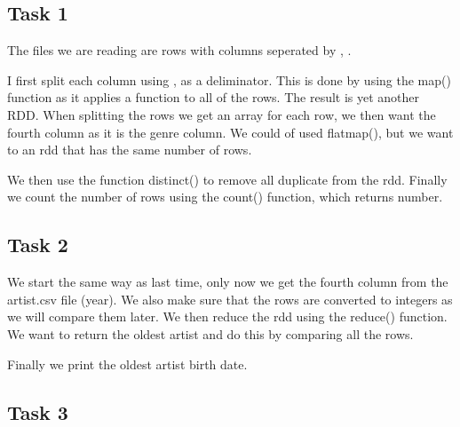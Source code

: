 \documentclass[12pt]{article}
\begin{document}
\subsection{Task 1}

The files we are reading are rows with columns seperated by , .

I first split each column using , as a deliminator. This is done by using the map() function as it applies a function to all of the rows. The result is yet another RDD. When splitting the rows we get an array for each row, we then want the fourth column as it is the genre column. We could of used flatmap(), but we want to an rdd that has the same number of rows.

We then use the function distinct() to remove all duplicate from the rdd. Finally we count the number of rows using the count() function, which returns  number.


\subsection{Task 2}

We start the same way as last time, only now we get the fourth column from the artist.csv file (year). We also make sure that the rows are converted to integers as we will compare them later. We then reduce the rdd using the reduce() function. We want to return the oldest artist and do this by comparing all the rows.

Finally we print the oldest artist birth date.

\subsection{Task 3}
\end{document}
